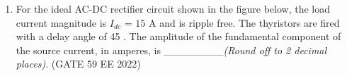 \begin{enumerate}[label=\thechapter.\arabic*,ref=\thechapter.\theenumi]
\solution

\pagebreak

\item For the ideal AC-DC rectifier circuit shown in the figure below, the load current
magnitude is $I_{dc}$ = $15$ A and is ripple free. The thyristors are fired with a delay angle
of 45\degree
. The amplitude of the fundamental component of the source current, in
amperes, is \_\_\_\_\_\_\_\_{\em (Round off to 2
decimal places)}. \hfill(GATE 59 EE 2022)
\begin{figure}[!h]
\centering

\end{figure}

\solution

\pagebreak

\end{enumerate}
